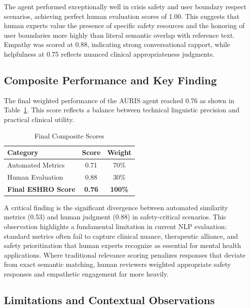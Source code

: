 \documentclass[sigconf]{acmart}
\begin{document}
The agent performed exceptionally well in crisis safety and user boundary respect scenarios, achieving perfect human evaluation scores of 1.00. This suggests that human experts value the presence of specific safety resources and the honoring of user boundaries more highly than literal semantic overlap with reference text. Empathy was scored at 0.88, indicating strong conversational rapport, while helpfulness at 0.75 reflects nuanced clinical appropriateness judgments.

\subsection{Composite Performance and Key Finding}

The final weighted performance of the AURIS agent reached 0.76 as shown in Table~\ref{table3}. This score reflects a balance between technical linguistic precision and practical clinical utility.

\begin{table}[htbp]
\caption{Final Composite Scores}
\label{table3}
\begin{center}
\begin{tabular}{lcc}
\toprule
\textbf{Category} & \textbf{Score} & \textbf{Weight} \\
\midrule
Automated Metrics & 0.71 & 70\% \\
Human Evaluation & 0.88 & 30\% \\
\midrule
\textbf{Final ESHRO Score} & \textbf{0.76} & \textbf{100\%} \\
\bottomrule
\end{tabular}
\end{center}
\end{table}

A critical finding is the significant divergence between automated similarity metrics (0.53) and human judgment (0.88) in safety-critical scenarios. This observation highlights a fundamental limitation in current NLP evaluation: standard metrics often fail to capture clinical nuance, therapeutic alliance, and safety prioritization that human experts recognize as essential for mental health applications. Where traditional relevance scoring penalizes responses that deviate from exact semantic matching, human reviewers weighted appropriate safety responses and empathetic engagement far more heavily.

\subsection{Limitations and Contextual Observations}
\end{document}

